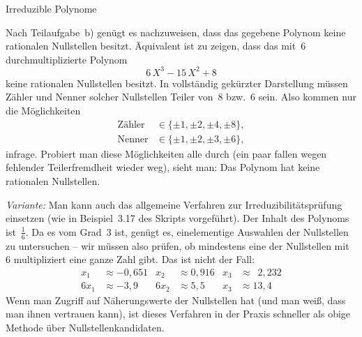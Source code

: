 \documentclass{algblatt}
\begin{document}
\begin{aufgabe}{Irreduzible Polynome}
\begin{loesungE}
\item Nach Teilaufgabe~b) genügt es nachzuweisen, dass das gegebene Polynom
keine rationalen Nullstellen besitzt. Äquivalent ist zu zeigen, dass das
mit~$6$ durchmultiplizierte Polynom
\[ 6 \, X^3 - 15 \, X^2 + 8 \]
keine rationalen Nullstellen besitzt. In vollständig gekürzter Darstellung
müssen Zähler und Nenner solcher Nullstellen Teiler von~$8$ bzw.~$6$ sein.
Also kommen nur die Möglichkeiten
\begin{align*}
  \text{Zähler} &\in \{ \pm 1, \pm 2, \pm 4, \pm 8 \}, \\
  \text{Nenner} &\in \{ \pm 1, \pm 2, \pm 3, \pm 6 \},
\end{align*}
infrage. Probiert man diese Möglichkeiten alle durch (ein paar fallen
wegen fehlender Teilerfremdheit wieder weg), sieht man: Das Polynom hat keine
rationalen Nullstellen.

\emph{Variante:} Man kann auch das allgemeine Verfahren zur
Irreduzibilitätsprüfung einsetzen (wie in Beispiel~3.17 des Skripts
vorgeführt). Der Inhalt des Polynoms ist~$\frac{1}{6}$. Da es vom Grad~3 ist,
genügt es, einelementige Auswahlen der Nullstellen zu untersuchen -- wir müssen
also prüfen, ob mindestens eine der Nullstellen mit~$6$ multipliziert eine
ganze Zahl gibt. Das ist nicht der Fall:
\begin{align*}
  x_1 &\approx -0{,}651 & x_2 &\approx 0{,}916 & x_3 &\approx \phantom{0}2{,}232 \\
  6 x_1 &\approx -3{,}9 & 6 x_2 &\approx 5{,}5 & x_3 &\approx 13{,}4
\end{align*}
Wenn man Zugriff auf Näherungswerte der Nullstellen hat (und man weiß, dass man
ihnen vertrauen kann), ist dieses Verfahren in der Praxis schneller als obige
Methode über Nullstellenkandidaten.
\end{loesungE}
\end{aufgabe}
\end{document}
